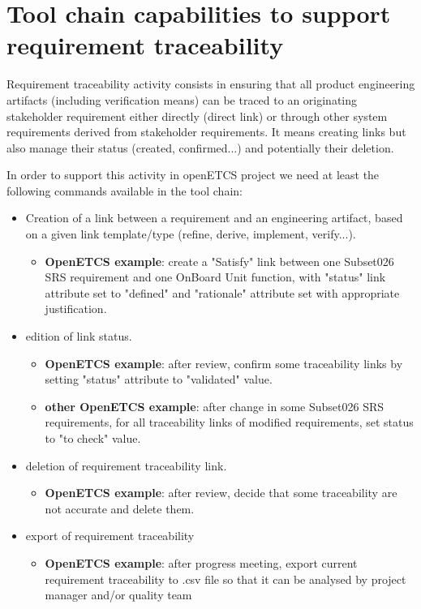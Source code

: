 \documentclass[11pt]{template/openetcs_report}
\begin{document}
\section{Tool chain capabilities to support requirement traceability}
\label{sec-3-2}  
Requirement traceability activity consists in ensuring that all product engineering artifacts (including verification means) can be traced to an originating stakeholder requirement either directly (direct link) or through other system requirements derived from stakeholder requirements. It means creating links but also manage their status (created, confirmed...) and potentially their deletion.

In order to support this activity in openETCS project we need at least the following commands available in the tool chain:

\begin{itemize}

\item Creation of a link between a requirement and an engineering artifact, based on a given link template/type (refine, derive, implement, verify...). 
\begin{itemize} \item \textbf{OpenETCS example}: create a "Satisfy" link between one Subset026 SRS requirement and one OnBoard Unit function, with  "status" link attribute set to "defined" and "rationale" attribute set with appropriate justification.\end{itemize}

\item edition of link status. 
\begin{itemize} \item \textbf{OpenETCS example}: after review, confirm some traceability links  by setting "status" attribute to "validated" value.
	\item \textbf{other OpenETCS example}: after change in some Subset026 SRS requirements, for all traceability links of modified requirements, set status to "to check" value.\end{itemize}

\item deletion of requirement traceability link. 
\begin{itemize} \item \textbf{OpenETCS example}: after review, decide that some traceability are not accurate and delete them.\end{itemize}

\item export of requirement traceability
\begin{itemize} \item \textbf{OpenETCS example}: after progress meeting, export current requirement traceability to .csv file so that it can be analysed by project manager and/or quality team\end{itemize}

\end{itemize}
\end{document}
